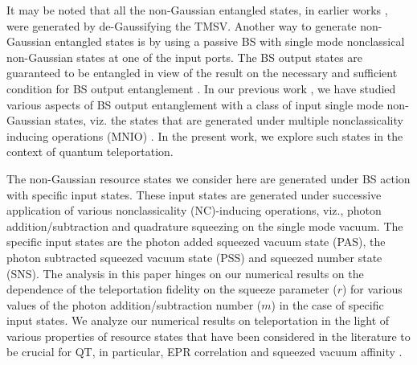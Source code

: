 \documentclass[letter,scriptaddress,twocolumn, prl,showkeys]{revtex4}
\begin{document}
It may be noted that all the non-Gaussian entangled states, in earlier works \cite{ent_grangier,tp_illuminati,tp_yang,tp_lee, ent_benlloch,tp_wang,tp_agarwal,tp_zubairy}, were generated by de-Gaussifying the TMSV. 
Another way to generate non-Gaussian entangled states is by using a passive BS with single mode nonclassical non-Gaussian states at one of the input ports. 
The BS output states are guaranteed to be entangled in view of the result on the necessary and sufficient condition for BS output entanglement \cite{nc_bsent}.
In our previous work \cite{bose_kumar}, we have studied various aspects of BS output entanglement with a class of input single mode non-Gaussian states, viz. the states that are generated under multiple nonclassicality inducing operations (MNIO) \cite{qs_mnc}.
In the present work, we explore such states in the context of quantum teleportation. 

The non-Gaussian resource states we consider here are generated under BS action with specific input states.
These input states are generated under successive application of various nonclassicality (NC)-inducing operations, viz., photon addition/subtraction and quadrature squeezing on the single mode vacuum.
The specific input states are the photon added squeezed vacuum state (PAS), the photon subtracted squeezed vacuum state (PSS) and squeezed number state (SNS).
The analysis in this paper hinges on our numerical results on the dependence of the teleportation fidelity on the squeeze parameter ($r$) for various values of the photon addition/subtraction number ($m$) in the case of specific input states.
We analyze our numerical results on teleportation in the light of various properties of resource states that have been considered in the literature to be crucial for QT, in particular, EPR correlation \cite{tp_yang,tp_lee,tp_wang,tp_agarwal,tp_zubairy} and squeezed vacuum affinity \cite{tp_illuminati}.
\end{document}
